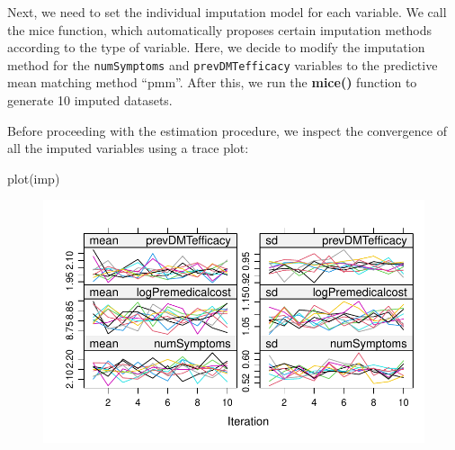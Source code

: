 \documentclass[
  letterpaper,
  DIV=11,
  numbers=noendperiod]{scrreprt}
\newenvironment{Shaded}{\begin{snugshade}}{\end{snugshade}}
\newcommand{\AttributeTok}[1]{\textcolor[rgb]{0.40,0.45,0.13}{#1}}
\newcommand{\CommentTok}[1]{\textcolor[rgb]{0.37,0.37,0.37}{#1}}
\newcommand{\ConstantTok}[1]{\textcolor[rgb]{0.56,0.35,0.01}{#1}}
\newcommand{\DecValTok}[1]{\textcolor[rgb]{0.68,0.00,0.00}{#1}}
\newcommand{\FunctionTok}[1]{\textcolor[rgb]{0.28,0.35,0.67}{#1}}
\newcommand{\NormalTok}[1]{\textcolor[rgb]{0.00,0.23,0.31}{#1}}
\newcommand{\OtherTok}[1]{\textcolor[rgb]{0.00,0.23,0.31}{#1}}
\newcommand{\SpecialCharTok}[1]{\textcolor[rgb]{0.37,0.37,0.37}{#1}}
\newcommand{\StringTok}[1]{\textcolor[rgb]{0.13,0.47,0.30}{#1}}
\begin{document}
Next, we need to set the individual imputation model for each variable.
We call the mice function, which automatically proposes certain
imputation methods according to the type of variable. Here, we decide to
modify the imputation method for the \texttt{numSymptoms} and
\texttt{prevDMTefficacy} variables to the predictive mean matching
method ``pmm''. After this, we run the \textbf{mice()} function to
generate 10 imputed datasets.

\begin{Shaded}
\end{Shaded}

Before proceeding with the estimation procedure, we inspect the
convergence of all the imputed variables using a trace plot:

\begin{Shaded}
\begin{Highlighting}[]
\FunctionTok{plot}\NormalTok{(imp)}
\end{Highlighting}
\end{Shaded}

\begin{figure}[H]

{\centering \includegraphics{chapter_09_files/figure-pdf/homimp convergency-1.pdf}

}

\end{figure}
\end{document}
